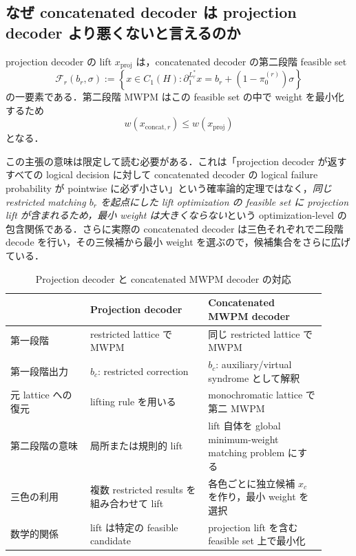 \documentclass[a4paper,11pt]{ltjsarticle}
\newcommand{\bd}{\partial}
\begin{document}
\subsection{なぜ concatenated decoder は projection decoder より悪くないと言えるのか}

projection decoder の lift $x_{\mathrm{proj}}$ は，concatenated decoder の第二段階 feasible set
\begin{equation}
 \mathcal{F}_r(b_r,\sigma)
 :=\left\{x\in C_1(H):\bd_1^{L^*_r}x=b_r+(1-\pi_0^{(r)})\sigma\right\}
\end{equation}
の一要素である．第二段階 MWPM はこの feasible set の中で weight を最小化するため
\begin{equation}
 w(x_{\mathrm{concat},r})
 \le w(x_{\mathrm{proj}})
 \label{eq:weight-dominance}
\end{equation}
となる．

この主張の意味は限定して読む必要がある．これは「projection decoder が返すすべての logical decision に対して concatenated decoder の logical failure probability が pointwise に必ず小さい」という確率論的定理ではなく，\emph{同じ restricted matching $b_r$ を起点にした lift optimization の feasible set に projection lift が含まれるため，最小 weight は大きくならない}という optimization-level の包含関係である．さらに実際の concatenated decoder は三色それぞれで二段階 decode を行い，その三候補から最小 weight を選ぶので，候補集合をさらに広げている．

\begin{table}[t]
\centering
\caption{Projection decoder と concatenated MWPM decoder の対応}
\begin{tabular}{p{0.23\linewidth}p{0.34\linewidth}p{0.34\linewidth}}
\toprule
 & Projection decoder & Concatenated MWPM decoder\\
\midrule
第一段階 & restricted lattice で MWPM & 同じ restricted lattice で MWPM\\
第一段階出力 & $b_c$: restricted correction & $b_c$: auxiliary/virtual syndrome として解釈\\
元 lattice への復元 & lifting rule を用いる & monochromatic lattice で第二 MWPM\\
第二段階の意味 & 局所または規則的 lift & lift 自体を global minimum-weight matching problem にする\\
三色の利用 & 複数 restricted results を組み合わせて lift & 各色ごとに独立候補 $x_c$ を作り，最小 weight を選択\\
数学的関係 & lift は特定の feasible candidate & projection lift を含む feasible set 上で最小化\\
\bottomrule
\end{tabular}
\end{table}
\end{document}
